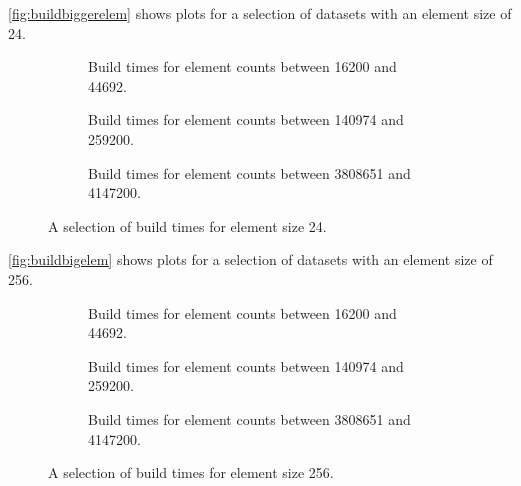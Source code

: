 \autoref{fig:buildbiggerelem} shows plots for a selection of datasets with an element size of 24.

\begin{figure}[H]
    \centering
    \begin{subfigure}{0.458\textwidth}
        
        \caption[Build times for element counts between 16200 and 44692.]{Build times for element counts between 16200 and 44692.}
        \label{sfig:buildbiggerelemsmall}
    \end{subfigure}\hfill
    \begin{subfigure}{0.458\textwidth}
        
        \caption[Build times for element counts between 140974 and 259200.]{Build times for element counts between 140974 and 259200.}
        \label{sfig:buildbiggerelemmedium}
    \end{subfigure}\hfill
    \begin{subfigure}{0.458\textwidth}
        
        \caption[Build times for element counts between 3808651 and 4147200.]{Build times for element counts between 3808651 and 4147200.}
        \label{sfig:buildbiggerelemlarge}
    \end{subfigure}
    \caption[A selection of build times for element size 24.]{A selection of build times for element size 24.}
    \label{fig:buildbiggerelem}
\end{figure}

\autoref{fig:buildbigelem} shows plots for a selection of datasets with an element size of 256.

\begin{figure}[H]
    \centering
    \begin{subfigure}{0.458\textwidth}
        
        \caption[Build times for element counts between 16200 and 44692.]{Build times for element counts between 16200 and 44692.}
        \label{sfig:buildbigelemsmall}
    \end{subfigure}\hfill
    \begin{subfigure}{0.458\textwidth}
        
        \caption[Build times for element counts between 140974 and 259200.]{Build times for element counts between 140974 and 259200.}
        \label{sfig:buildbigelemmedium}
    \end{subfigure}\hfill
    \begin{subfigure}{0.458\textwidth}
        
        \caption[Build times for element counts between 3808651 and 4147200.]{Build times for element counts between 3808651 and 4147200.}
        \label{sfig:buildbigelemlarge}
    \end{subfigure}
    \caption[A selection of build times for element size 256.]{A selection of build times for element size 256.}
    \label{fig:buildbigelem}
\end{figure}

